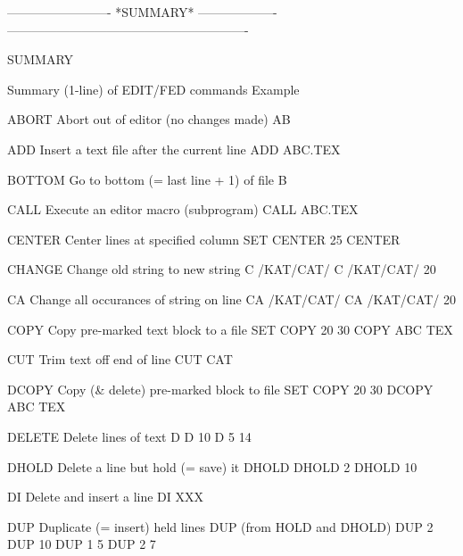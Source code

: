 -------------------------  *SUMMARY*  -------------------
----------------------------------------------------------
 
SUMMARY
 
Summary (1-line) of EDIT/FED commands                 Example
 
ABORT     Abort out of editor (no changes made)       AB
 
ADD       Insert a text file after the current line   ADD ABC.TEX
 
BOTTOM    Go to bottom (= last line + 1) of file      B
 
CALL      Execute an editor macro (subprogram)        CALL ABC.TEX
 
CENTER    Center lines at specified column            SET CENTER 25
                                                      CENTER
 
CHANGE    Change old string to new string             C /KAT/CAT/
                                                      C /KAT/CAT/ 20
 
CA        Change all occurances of string on line     CA /KAT/CAT/
                                                      CA /KAT/CAT/ 20
 
COPY      Copy pre-marked text block to a file        SET COPY 20 30
                                                      COPY ABC TEX
 
CUT       Trim text off end of line                   CUT CAT
 
DCOPY     Copy (& delete) pre-marked block to file    SET COPY 20 30
                                                      DCOPY ABC TEX
 
DELETE    Delete lines of text                        D
                                                      D 10
                                                      D 5 14
 
DHOLD     Delete a line but hold (= save) it          DHOLD
                                                      DHOLD 2
                                                      DHOLD 10
 
DI        Delete and insert a line                    DI XXX
 
DUP       Duplicate (= insert) held lines             DUP
          (from HOLD and DHOLD)                       DUP 2
                                                      DUP 10
                                                      DUP 1 5
                                                      DUP 2 7
 
